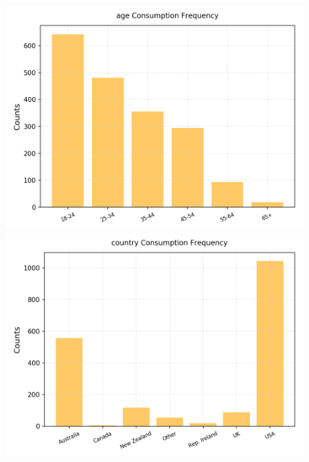 \documentclass{article}
\begin{document}
\begin{figure}[h!]
	\centering
	\begin{minipage}[b]{0.32\textwidth}
		\includegraphics[width=\textwidth]{plots/drugsPlots/age_freq.png}

	\end{minipage}
	\begin{minipage}[b]{0.32\textwidth}
		\includegraphics[width=\textwidth]{plots/drugsPlots/country_freq.png}


\end{minipage}
\end{figure}
\end{document}
